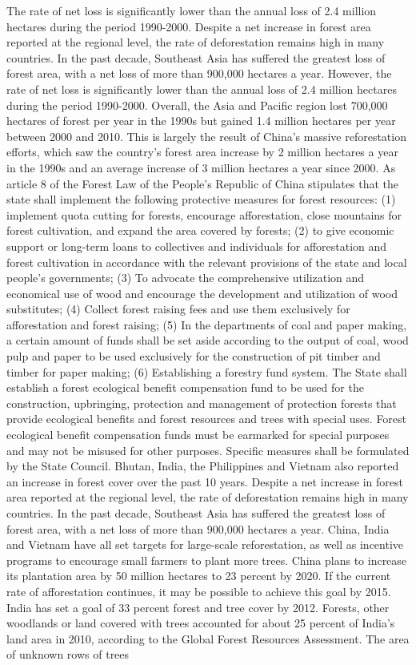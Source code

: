\documentclass{book}\usepackage{knitr}
\begin{document}
{	The rate of net loss is significantly lower than the annual loss of 2.4 million hectares during the period 1990-2000. Despite a net increase in forest area reported at the regional level, the rate of deforestation remains high in many countries. In the past decade, Southeast Asia has suffered the greatest loss of forest area, with a net loss of more than 900,000 hectares a year. However, the rate of net loss is significantly lower than the annual loss of 2.4 million hectares during the period 1990-2000. Overall, the Asia and Pacific region lost 700,000 hectares of forest per year in the 1990s but gained 1.4 million hectares per year between 2000 and 2010. This is largely the result of China's massive reforestation efforts, which saw the country's forest area increase by 2 million hectares a year in the 1990s and an average increase of 3 million hectares a year since 2000. As article 8 of the Forest Law of the People's Republic of China stipulates that the state shall implement the following protective measures for forest resources: (1) implement quota cutting for forests, encourage afforestation, close mountains for forest cultivation, and expand the area covered by forests; (2) to give economic support or long-term loans to collectives and individuals for afforestation and forest cultivation in accordance with the relevant provisions of the state and local people's governments; (3) To advocate the comprehensive utilization and economical use of wood and encourage the development and utilization of wood substitutes; (4) Collect forest raising fees and use them exclusively for afforestation and forest raising; (5) In the departments of coal and paper making, a certain amount of funds shall be set aside according to the output of coal, wood pulp and paper to be used exclusively for the construction of pit timber and timber for paper making; (6) Establishing a forestry fund system. The State shall establish a forest ecological benefit compensation fund to be used for the construction, upbringing, protection and management of protection forests that provide ecological benefits and forest resources and trees with special uses. Forest ecological benefit compensation funds must be earmarked for special purposes and may not be misused for other purposes. Specific measures shall be formulated by the State Council. Bhutan, India, the Philippines and Vietnam also reported an increase in forest cover over the past 10 years. Despite a net increase in forest area reported at the regional level, the rate of deforestation remains high in many countries. In the past decade, Southeast Asia has suffered the greatest loss of forest area, with a net loss of more than 900,000 hectares a year. China, India and Vietnam have all set targets for large-scale reforestation, as well as incentive programs to encourage small farmers to plant more trees. China plans to increase its plantation area by 50 million hectares to 23 percent by 2020. If the current rate of afforestation continues, it may be possible to achieve this goal by 2015. India has set a goal of 33 percent forest and tree cover by 2012. Forests, other woodlands or land covered with trees accounted for about 25 percent of India's land area in 2010, according to the Global Forest Resources Assessment. The area of unknown rows of trees }
\end{document}
